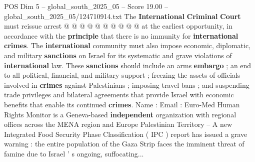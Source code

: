 \begin{textsample}{POS Dim 5 – global\_south\_2025\_05 – Score 19.00 – global\_south\_2025\_05/124710914.txt}
The \textbf{International} \textbf{Criminal} \textbf{Court} must reissue arrest @ @ @ @ @ @ @ @ @ @ at the earliest opportunity, in accordance with the \textbf{principle} that there is no immunity for \textbf{international} \textbf{crimes}.
The \textbf{international} community must also impose economic, diplomatic, and military \textbf{sanctions} on Israel for its systematic and grave violations of \textbf{international} law.
These \textbf{sanctions} should include an arms \textbf{embargo} ; an end to all political, financial, and military support ; freezing the assets of officials involved in \textbf{crimes} against Palestinians ; imposing travel bans ; and suspending trade privileges and bilateral agreements that provide Israel with economic benefits that enable its continued \textbf{crimes}.
Name : Email : Euro-Med Human Rights Monitor is a Geneva-based \textbf{independent} organization with regional offices across the MENA region and Europe Palestinian Territory -- A new Integrated Food Security Phase Classification ( IPC ) report has issued a grave warning : the entire population of the Gaza Strip faces the imminent threat of famine due to Israel ' s ongoing, suffocating...

\end{textsample}
